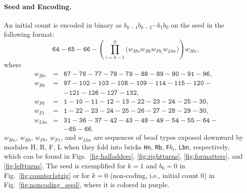 \documentclass[twocolumn]{svjour3}
\begin{document}
\paragraph{Seed and Encoding.}
An initial count is encoded in binary as $b_{k-1}b_{k-2} \cdots b_1b_0$ on the seed in the following format:
\begin{equation} \label{eq:zagencoding}
\texttt{64}{-}\texttt{65}{-}\texttt{66}{-}\left( \prod^0_{i = k-1} \bigl(  w_{Hn} w_{Rb} w_{Fb_i} w_{Lbn} \bigr) \right) w_{Hn}, 
\end{equation}
where 
\begin{eqnarray*}
w_{Hn} &=& \texttt{67}{-}\texttt{76}{-}\texttt{77}{-}\texttt{78}{-}\texttt{79}{-}\texttt{88}{-}\texttt{89}{-}\texttt{90}{-}\texttt{91}{-}\texttt{96},\\
w_{Rb} &=& \texttt{97}{-}\texttt{102}{-}\texttt{103}{-}\texttt{108}{-}\texttt{109}{-}\texttt{114}{-}\texttt{115}{-}\texttt{120}{-} \\
& & {-}\texttt{121}{-}\texttt{126}{-}\texttt{127}{-}\texttt{132},\\
w_{F0} &=& \texttt{1}{-}\texttt{10}{-}\texttt{11}{-}\texttt{12}{-}\texttt{13}{-}\texttt{22}{-}\texttt{23}{-}\texttt{24}{-}\texttt{25}{-}\texttt{30},\\
w_{F1} &=& \texttt{1}{-}\texttt{22}{-}\texttt{23}{-}\texttt{24}{-}\texttt{25}{-}\texttt{26}{-}\texttt{27}{-}\texttt{28}{-}\texttt{29}{-}\texttt{30},\\
 w_{Lbn} &=& \texttt{31}{-}\texttt{36}{-}\texttt{37}{-}\texttt{42}{-}\texttt{43}{-}\texttt{48}{-}\texttt{49}{-}\texttt{54}{-}\texttt{55}{-}\texttt{64}{-}\\
& & {-}\texttt{65}{-}\texttt{66}.
\end{eqnarray*}
$w_{Hn}$, $w_{Rb}$, $w_{F0}$, $w_{F1}$, and $w_{Lbn}$ are sequences of bead types exposed downward by modules H, R, F, L when they fold into bricks \texttt{Hn}, \texttt{Rb}, \texttt{F}$b_i$, \texttt{Lbn}, respectively, which can be found in Figs.~\ref{fig:halfadders}, \ref{fig:rightturns}, \ref{fig:formatters}, and \ref{fig:leftturns}.
The seed is exemplified for $k = 1$ and $b_0 = 0$ in Fig.~\ref{fig:counter1stzig} or for $k = 0$ (non-coding, i.e., initial count 0) in Fig.~\ref{fig:noncoding_seed}, where it is colored in purple.
\end{document}
